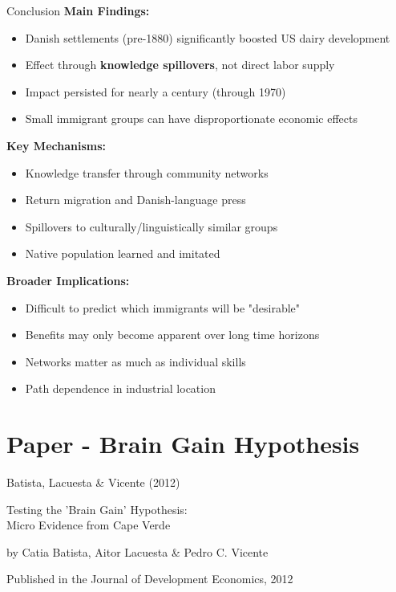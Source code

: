\documentclass{beamer}
\begin{document}
\begin{frame}{Conclusion}
\textbf{Main Findings:}
\begin{itemize}
    \item Danish settlements (pre-1880) significantly boosted US dairy development
    \item Effect through \textbf{knowledge spillovers}, not direct labor supply
    \item Impact persisted for nearly a century (through 1970)
    \item Small immigrant groups can have disproportionate economic effects
\end{itemize}

\vspace{0.3cm}
\textbf{Key Mechanisms:}
\begin{itemize}
    \item Knowledge transfer through community networks
    \item Return migration and Danish-language press
    \item Spillovers to culturally/linguistically similar groups
    \item Native population learned and imitated
\end{itemize}

\vspace{0.3cm}
\textbf{Broader Implications:}
\begin{itemize}
    \item Difficult to predict which immigrants will be "desirable"
    \item Benefits may only become apparent over long time horizons
    \item Networks matter as much as individual skills
    \item Path dependence in industrial location
\end{itemize}
\end{frame}

\section{Paper - Brain Gain Hypothesis}

\begin{frame}{Batista, Lacuesta \& Vicente (2012)}
\begin{center}
    \begin{Large}
        Testing the 'Brain Gain' Hypothesis: \\
        Micro Evidence from Cape Verde \\
    \end{Large}
    \vspace{0.3cm}
    \begin{large}
        by Catia Batista, Aitor Lacuesta \& Pedro C. Vicente  \\
    \end{large}
    \vspace{0.2cm}
    Published in the Journal of Development Economics, 2012
\end{center}    
\end{frame}
\end{document}
